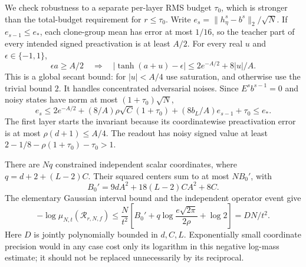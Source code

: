 \documentclass[11pt]{article}
\begin{document}
We check robustness to a separate per-layer RMS budget $\tau_0$, which is
stronger than the total-budget requirement for $r\le\tau_0$. Write
$e_s=\|h^s_\eta-b^s\|_2/\sqrt N$. If $e_{s-1}\le e_*$, each clone-group
mean has error at most $1/16$, so the teacher part of every intended signed
preactivation is at least $A/2$. For every real $u$ and $\epsilon\in\{-1,1\}$,
\[
 \epsilon a\ge A/2\quad\Longrightarrow\quad
 |\tanh(a+u)-\epsilon|\le2e^{-A/2}+8|u|/A.
\]
This is a global secant bound: for $|u|<A/4$ use saturation, and otherwise
use the trivial bound $2$. It handles concentrated adversarial noises.
Since $E^sb^{s-1}=0$ and noisy states have norm at most
$(1+\tau_0)\sqrt N$,
\[
 e_s\le2e^{-A/2}+(8/A)\rho\sqrt C(1+\tau_0)
 +(8b_L/A)e_{s-1}+\tau_0\le e_*.
\]
The first layer starts the invariant because its coordinatewise
preactivation error is at most $\rho(d+1)\le A/4$.
The readout has noisy signed value at least
$2-1/8-\rho(1+\tau_0)-\tau_0>1$.

There are $Nq$ constrained independent scalar coordinates, where
$q=d+2+(L-2)C$. Their squared centers sum to at most $NB_0'$, with
\[
 B_0'=9dA^2+18(L-2)CA^2+8C.
\]
The elementary Gaussian interval bound and the independent operator event give
\[
 -\log\mu_{N,t}(\mathcal R_{r,N,f})
 \le \frac{N}{t^2}\left[B_0'+q\log\frac{e\sqrt{2\pi}}{2\rho}+\log2\right]
 =DN/t^2.
\]
Here $D$ is jointly polynomially bounded in $d,C,L$. Exponentially small
coordinate precision would in any case cost only its logarithm in this
negative log-mass estimate; it should not be replaced unnecessarily by its
reciprocal.









\end{document}
